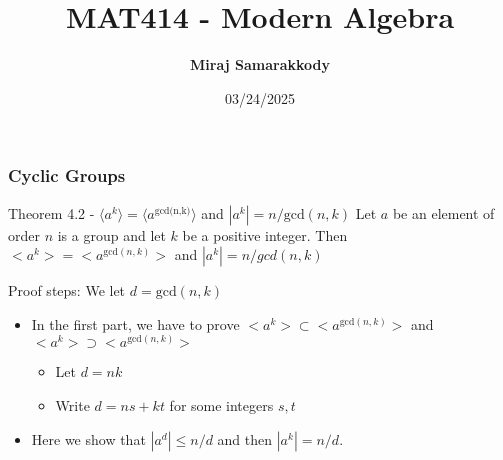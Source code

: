\documentclass{beamer}
\title{MAT414 - Modern Algebra}
\author{\textbf{Miraj Samarakkody}}
\institute{Tougaloo College}
\date{03/24/2025}
\begin{document}
\begin{frame}
    \titlepage
\end{frame}

\begin{frame}
    \frametitle{Cyclic Groups}

    \begin{block}{Theorem 4.2 - \(\langle a^k \rangle= \langle a^{\text{gcd(n,k)}}\rangle\) and \(|a^k|=n/ \text{gcd}(n,k)\)}
        Let \(a\) be an element of order \(n\) is a group and let \(k\) be a positive integer. Then \(<a^k>=<a^{\text{gcd}(n,k)}>\) and \(|a^k|=n/gcd(n,k)\)
    \end{block}\pause 
    \begin{block}{Proof steps:}
        We let \(d=\text{gcd}(n,k)\)
        \begin{itemize}
            \item In the first part, we have to prove \(<a^k> \subset <a^{\text{gcd}(n,k)}>\) and \(<a^k>\supset <a^{\text{gcd}(n,k)}>\)\pause
            \begin{itemize}
                \item Let \(d=nk\)\pause
                \item Write \(d=ns+kt\) for some integers \(s,t \)\pause
            \end{itemize} 
            \item Here we show that \(|a^d|\leq n/d\) and then \(|a^k| =n/d\). 
        \end{itemize}
        
    \end{block}
\end{frame}

    
\end{document}
